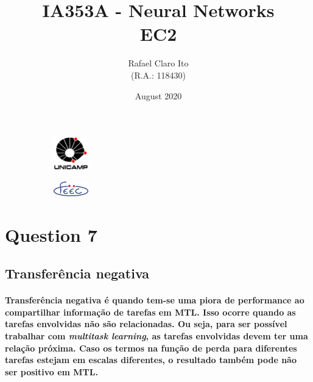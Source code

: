 \documentclass[a4paper]{article}    %
\begin{document}
\begin{figure}
    \centering
    \begin{subfigure}{0.45\textwidth}
        \centering
        \includegraphics[width=1.5cm]{unicamp}
    \end{subfigure}
    \hfill
    \begin{subfigure}{0.45\textwidth}
        \centering
        \includegraphics[width=1.5cm]{feec}
    \end{subfigure}
\end{figure}

\title{
    \vspace{5cm}
    IA353A - Neural Networks\\
    EC2
    \vspace{1cm}
}
\author{
    Rafael Claro Ito\\
    (R.A.: 118430)
    \vspace{11cm}
}
\date{August 2020}
\maketitle
\newpage

\setcounter{section}{7}
\section*{Question 7}

\subsection{Transferência negativa}
\paragraph{Transferência negativa é quando tem-se uma piora de performance ao compartilhar informação de tarefas em MTL. Isso ocorre quando as tarefas envolvidas não são relacionadas. Ou seja, para ser possível trabalhar com \emph{multitask learning}, as tarefas envolvidas devem ter uma relação próxima. Caso os termos na função de perda para diferentes tarefas estejam em escalas diferentes, o resultado também pode não ser positivo em MTL.}
\end{document}
